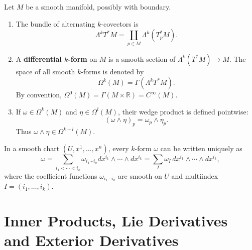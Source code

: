\documentclass[12pt, oneside]{book}
\begin{document}
\begin{definition}
    Let $M$ be a smooth manifold, possibly with boundary.
    \begin{enumerate}
        \item
              The bundle of alternating $k$-covectors is
              \[
                  \Lambda^kT^*M
                  =
                  \coprod_{p\in M}\Lambda^k(T_p^*M).
              \]
        \item
              A \textbf{differential $k$-form} on $M$ is a smooth section of $\Lambda^k(T^*M) \to M$. The space of all smooth $k$-forms is denoted by
              \[
                  \Omega^k(M)=\Gamma(\Lambda^kT^*M).
              \]
              By convention, $\Omega^0(M)=\Gamma(M\times \mathbb{R})=C^\infty(M)$.
        \item
              If $\omega\in\Omega^k(M)$ and $\eta\in\Omega^l(M)$, their wedge product is defined pointwise:
              \[
                  (\omega\wedge\eta)_p
                  =
                  \omega_p\wedge\eta_p.
              \]
              Thus $\omega\wedge\eta\in\Omega^{k+l}(M)$.
    \end{enumerate}
    \begin{remark}
        In a smooth chart $(U,x^1,\ldots,x^n)$, every $k$-form $\omega$ can be written uniquely as
        \[
            \omega
            =
            \sum_{i_1<\cdots<i_k}
            \omega_{i_1\cdots i_k}
            dx^{i_1}\wedge\cdots\wedge dx^{i_k}=
            \sum_I \omega_I\,dx^{i_1}\wedge\cdots\wedge dx^{i_k},
        \]
        where the coefficient functions $\omega_{i_1\cdots i_k}$ are smooth on $U$ and multiindex $I=(i_1,\ldots,i_k)$.
    \end{remark}
\end{definition}






\section{Inner Products, Lie Derivatives and Exterior Derivatives}
\end{document}
